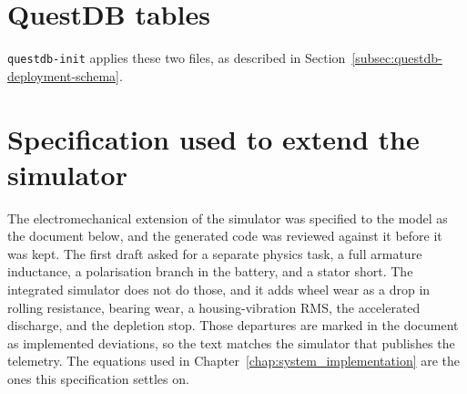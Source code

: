 \section{QuestDB tables}
\label{sec:app_questdb_schema}

\texttt{questdb-init} applies these two files, as described in Section~\ref{subsec:questdb-deployment-schema}.





\section{Specification used to extend the simulator}
\label{app:simulator_prompt}

The electromechanical extension of the simulator was specified to the model as the document below, and the generated code was reviewed against it before it was kept. The first draft asked for a separate physics task, a full armature inductance, a polarisation branch in the battery, and a stator short. The integrated simulator does not do those, and it adds wheel wear as a drop in rolling resistance, bearing wear, a housing-vibration RMS, the accelerated discharge, and the depletion stop. Those departures are marked in the document as implemented deviations, so the text matches the simulator that publishes the telemetry. The equations used in Chapter~\ref{chap:system_implementation} are the ones this specification settles on.



